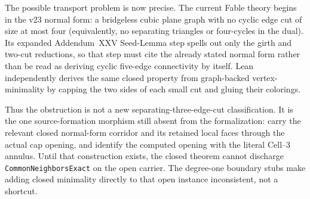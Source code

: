 \documentclass[11pt]{article}
\theoremstyle{definition}
\begin{document}
The possible transport problem is now precise.  The current Fable theory
begins in the v23 normal form: a bridgeless cubic plane graph with no cyclic
edge cut of size at most four (equivalently, no separating triangles or
four-cycles in the dual).  Its expanded Addendum~XXV Seed-Lemma step spells
out only the girth and two-cut reductions, so that step must cite the already
stated normal form rather than be read as deriving cyclic five-edge
connectivity by itself.  Lean independently derives the same closed property
from graph-backed vertex-minimality by capping the two sides of each small cut
and gluing their colorings.

Thus the obstruction is not a new separating-three-edge-cut classification.
It is the one source-formation morphism still absent from the formalization:
carry the relevant closed normal-form corridor and its retained local faces
through the actual cap opening, and identify the computed opening with the
literal Cell--3 annulus.  Until that construction exists, the closed theorem
cannot discharge \texttt{CommonNeighborsExact} on the open carrier.  The
degree-one boundary stubs make adding closed minimality directly to that open
instance inconsistent, not a shortcut.
\end{document}

